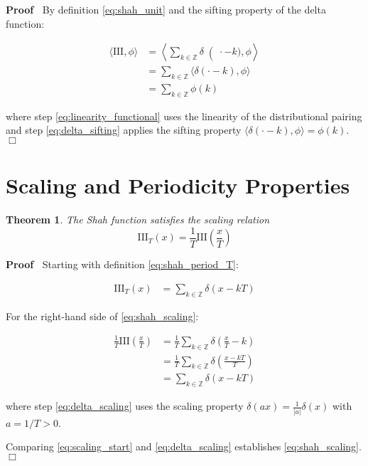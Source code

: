 \documentclass{article}
\newenvironment{proof}{\noindent\textbf{Proof\ }}{\hspace*{\fill}$\Box$\medskip}
\newtheorem{theorem}{Theorem}
\begin{document}
\begin{proof}
  By definition \eqref{eq:shah_unit} and the sifting property of the delta
  function:
  
  \begin{align}
    \langle \text{III}, \phi \rangle & \left. = \left\langle \sum_{k \in
    \mathbb{Z}} \delta \right( \cdot - k), \phi \right\rangle 
    \label{eq:shah_action_expand}\\
    & = \sum_{k \in \mathbb{Z}} \langle \delta (\cdot - k), \phi \rangle 
    \label{eq:linearity_functional}\\
    & = \sum_{k \in \mathbb{Z}} \phi (k)  \label{eq:delta_sifting}
  \end{align}
  
  where step \eqref{eq:linearity_functional} uses the linearity of the
  distributional pairing and step \eqref{eq:delta_sifting} applies the sifting
  property $\langle \delta (\cdot - k), \phi \rangle = \phi (k)$.
\end{proof}

\section{Scaling and Periodicity Properties}

\begin{theorem}
  \label{thm:shah_scaling}The Shah function satisfies the scaling relation
  \begin{equation}
    \label{eq:shah_scaling} \text{III}_T (x) = \frac{1}{T} \text{III} \left(
    \frac{x}{T} \right)
  \end{equation}
\end{theorem}

\begin{proof}
  Starting with definition \eqref{eq:shah_period_T}:
  
  \begin{align}
    \text{III}_T (x) & = \sum_{k \in \mathbb{Z}} \delta (x - kT) 
    \label{eq:scaling_start}
  \end{align}
  
  For the right-hand side of \eqref{eq:shah_scaling}:
  
  \begin{align}
    \frac{1}{T} \text{III} \left( \frac{x}{T} \right) & = \frac{1}{T}  \sum_{k
    \in \mathbb{Z}} \delta \left( \frac{x}{T} - k \right) 
    \label{eq:scaling_rhs}\\
    & = \frac{1}{T}  \sum_{k \in \mathbb{Z}} \delta \left( \frac{x - kT}{T}
    \right)  \label{eq:factor_out}\\
    & = \sum_{k \in \mathbb{Z}} \delta (x - kT)  \label{eq:delta_scaling}
  \end{align}
  
  where step \eqref{eq:delta_scaling} uses the scaling property $\delta (ax) =
  \frac{1}{|a|} \delta (x)$ with $a = 1 / T > 0$.
  
  Comparing \eqref{eq:scaling_start} and \eqref{eq:delta_scaling} establishes
  \eqref{eq:shah_scaling}.
\end{proof}
\end{document}
